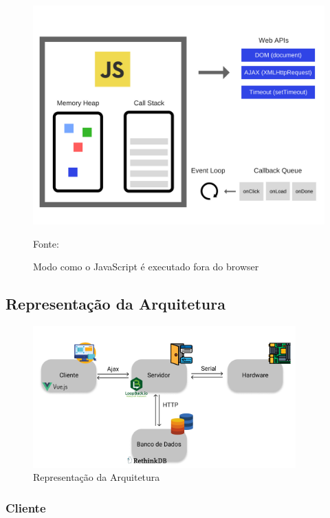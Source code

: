 \begin{figure}[h!]
	\centering
	\label{javascript backend}
		\includegraphics[keepaspectratio=true,scale=0.6]{figuras/javascript-backend.png}
	\caption{Modo como o JavaScript é executado fora do browser}
	{\footnotesize Fonte: \cite{javascript-backend}}
	\label{fig:javascript backend}
\end{figure}



\subsection{Representação da Arquitetura}

\begin{figure}[H]
\centering
\includegraphics[width=0.9\textwidth]{figuras/representacao_arq.png}
\caption{Representação da Arquitetura}
\label{fig:representacao_arq}
\end{figure}


\subsubsection{Cliente}

